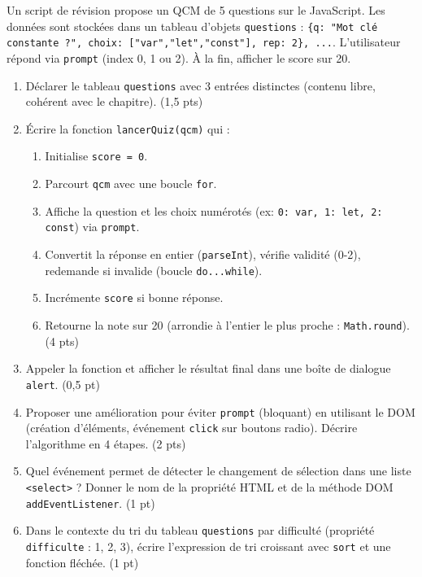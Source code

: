 \documentclass[11pt]{article}
\begin{document}
\begin{exercice}
Un script de révision propose un QCM de 5 questions sur le JavaScript. Les données sont stockées dans un tableau d'objets \texttt{questions} : \texttt{\{q: "Mot clé constante ?", choix: ["var","let","const"], rep: 2\}, ...}. L'utilisateur répond via \texttt{prompt} (index 0, 1 ou 2). À la fin, afficher le score sur 20.
\begin{enumerate}
    \item Déclarer le tableau \texttt{questions} avec 3 entrées distinctes (contenu libre, cohérent avec le chapitre). (1,5 pts)
    \item Écrire la fonction \texttt{lancerQuiz(qcm)} qui :
    \begin{enumerate}
        \item Initialise \texttt{score = 0}.
        \item Parcourt \texttt{qcm} avec une boucle \texttt{for}.
        \item Affiche la question et les choix numérotés (ex: \texttt{0: var, 1: let, 2: const}) via \texttt{prompt}.
        \item Convertit la réponse en entier (\texttt{parseInt}), vérifie validité (0-2), redemande si invalide (boucle \texttt{do...while}).
        \item Incrémente \texttt{score} si bonne réponse.
        \item Retourne la note sur 20 (arrondie à l'entier le plus proche : \texttt{Math.round}). (4 pts)
    \end{enumerate}
    \item Appeler la fonction et afficher le résultat final dans une boîte de dialogue \texttt{alert}. (0,5 pt)
    \item Proposer une amélioration pour éviter \texttt{prompt} (bloquant) en utilisant le DOM (création d'éléments, événement \texttt{click} sur boutons radio). Décrire l'algorithme en 4 étapes. (2 pts)
    \item Quel événement permet de détecter le changement de sélection dans une liste \texttt{<select>} ? Donner le nom de la propriété HTML et de la méthode DOM \texttt{addEventListener}. (1 pt)
    \item Dans le contexte du tri du tableau \texttt{questions} par difficulté (propriété \texttt{difficulte} : 1, 2, 3), écrire l'expression de tri croissant avec \texttt{sort} et une fonction fléchée. (1 pt)
\end{enumerate}
\end{exercice}
\end{document}
